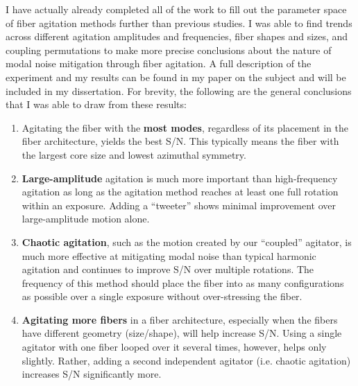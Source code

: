 \documentclass[11pt]{article}
\begin{document}
I have actually already completed all of the work to fill out the parameter space of fiber agitation methods further than previous studies. I was able to find trends across different agitation amplitudes and frequencies, fiber shapes and sizes, and coupling permutations to make more precise conclusions about the nature of modal noise mitigation through fiber agitation. A full description of the experiment and my results can be found in my paper on the subject \citep{Petersburg2018} and will be included in my dissertation. For brevity, the following are the general conclusions that I was able to draw from these results:
\begin{enumerate}
\item Agitating the fiber with the \textbf{most modes}, regardless of its placement in the fiber architecture, yields the best S/N. This typically means the fiber with the largest core size and lowest azimuthal symmetry.
\item \textbf{Large-amplitude} agitation is much more important than high-frequency agitation as long as the agitation method reaches at least one full rotation within an exposure. Adding a ``tweeter'' shows minimal improvement over large-amplitude motion alone.
\item \textbf{Chaotic agitation}, such as the motion created by our ``coupled'' agitator, is much more effective at mitigating modal noise than typical harmonic agitation and continues to improve S/N over multiple rotations. The frequency of this method should place the fiber into as many configurations as possible over a single exposure without over-stressing the fiber.
\item \textbf{Agitating more fibers} in a fiber architecture, especially when the fibers have different geometry (size/shape), will help increase S/N. Using a single agitator with one fiber looped over it several times, however, helps only slightly. Rather, adding a second independent agitator (i.e. chaotic agitation) increases S/N significantly more.
\end{enumerate}
\end{document}
